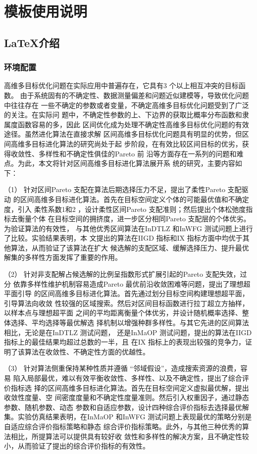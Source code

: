 \linespread{1.55}\selectfont
\chapter{模板使用说明}
\section{\LaTeX 介绍}
\subsection{环境配置}
高维多目标优化问题在实际应用中普遍存在，它具有3 个以上相互冲突的目标函数。
由于系统固有的不确定性、数据测量偏差和问题近似建模等，导致优化问题中往往存在
一些不确定的参数或者变量，不确定高维多目标优化问题受到了广泛的关注。在实际问
题中，不确定性参数的上、下边界的获取比概率分布函数和隶属度函数容易的多，因此
区间优化成为处理不确定性高维多目标优化问题的有效途径。虽然进化算法在直接求解
区间高维多目标优化问题具有明显的优势，但区间高维多目标进化算法的研究尚处于起
步阶段，在有效比较区间目标的优劣，获得收敛性、多样性和不确定性俱佳的Pareto 前
沿等方面存在一系列的问题和难点。为此，本文将针对区间高维多目标进化算法展开系
统的研究，主要内容如下\cite{chen2001}：

（1） 针对区间Pareto 支配在算法后期选择压力不足，提出了柔性Pareto 支配驱动
的区间高维多目标进化算法。首先在目标空间定义个体的可能最优值和不确定度，引入
柔性系数1和2 ，设计柔性区间Pareto 支配准则；然后提出个体松弛度指标去衡量个体
在目标空间的拥挤度，进一步区分相同Pareto 支配层的个体优劣。为验证算法的有效性，
与其他优秀区间算法在InDTLZ 和InWFG 测试问题上进行了比较。实验结果表明，本
文提出的算法在IIGD 指标和IX 指标方面中均优于其他算法，从而验证了该算法在扩大
候选解的支配区域、缓解选择压力、提升最优解集的多样性方面发挥了重要的作用\cite{nadkarni1992}。

（2） 针对非支配解占候选解的比例呈指数形式扩展引起的Pareto 支配失效，过分
依靠多样性维护机制容易造成Pareto 最优前沿收敛困难等问题，提出了理想超平面引导
的区间高维多目标进化算法。首先通过划分目标空间构建理想超平面，引导算法向收敛
性较强的区域搜索。然后对区间目标函数进行拉丁超立方抽样，以样本点与理想超平面
之间的平均距离衡量个体优劣，并设计随机概率选择、整体选择、平均选择等最优解选
择机制以增强种群多样性。与其它先进的区间算法相比，无论是在InDTLZ 测试问题，
还是InMaOP 测试问题，提出的算法在IIGD 指标上的最佳结果均超过总数的一半，且
在IX 指标上的表现出较强的竞争力，证明了该算法在收敛性、不确定性方面的优越性。

（3） 针对算法侧重保持某种性质并遵循 “邻域假设”，造成搜索资源的浪费，容易
陷入局部最优，难以有效平衡收敛性、多样性、以及不确定性，提出了综合评价指标选
择的区间高维多目标进化算法。首先在目标空间定义虚拟最优解，提出收敛性度量、空
间密度度量和不确定性度量准则。然后引入权重因子，通过静态参数、随机参数、动态
参数和自适应参数，设计四种综合评价指标去选择最优解集。实验仿真结果表明，在InMaOP 和InWFG 测试问题上表现最优的策略分别是自适应综合评价指标策略和静态
综合评价指标策略。此外，与其他三种优秀的算法相比，所提算法可以提供具有较好收
敛性和多样性的解决方案，且不确定性较小，从而验证了提出的综合评价指标的有效性。

